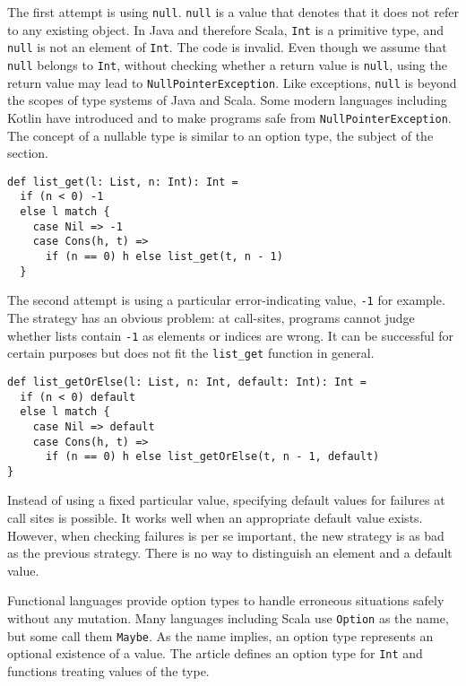 The first attempt is using \verb!null!. \verb!null! is a value that denotes that
it does not refer to any existing object. In Java and therefore Scala, \verb!Int!
is a primitive type, and \verb!null! is not an element of \verb!Int!. The code is
invalid. Even though we assume that \verb!null! belongs to \verb!Int!, without
checking whether a return value is \verb!null!, using the return value may lead
to \verb!NullPointerException!. Like exceptions, \verb!null! is beyond the scopes
of type systems of Java and Scala. Some modern languages including Kotlin have
introduced  and  to make programs safe
from \verb!NullPointerException!. The concept of a nullable type is similar to an
option type, the subject of the section.

\begin{verbatim}
def list_get(l: List, n: Int): Int =
  if (n < 0) -1
  else l match {
    case Nil => -1
    case Cons(h, t) =>
      if (n == 0) h else list_get(t, n - 1)
  }
\end{verbatim}

The second attempt is using a particular error-indicating value, \verb!-1! for
example. The strategy has an obvious problem: at call-sites, programs cannot
judge whether lists contain \verb!-1! as elements or indices are wrong. It can be
successful for certain purposes but does not fit the \verb!list_get! function in
general.

\begin{verbatim}
def list_getOrElse(l: List, n: Int, default: Int): Int =
  if (n < 0) default
  else l match {
    case Nil => default
    case Cons(h, t) =>
      if (n == 0) h else list_getOrElse(t, n - 1, default)
}
\end{verbatim}

Instead of using a fixed particular value, specifying default values for failures
at call sites is possible. It works well when an appropriate default value
exists. However, when checking failures is per se important, the new strategy is
as bad as the previous strategy. There is no way to distinguish an element and a
default value.

Functional languages provide option types to handle erroneous situations safely
without any mutation. Many languages including Scala use \verb!Option! as the
name, but some call them \verb!Maybe!. As the name implies, an option type
represents an optional existence of a value. The article defines an option type
for \verb!Int! and functions treating values of the type.

